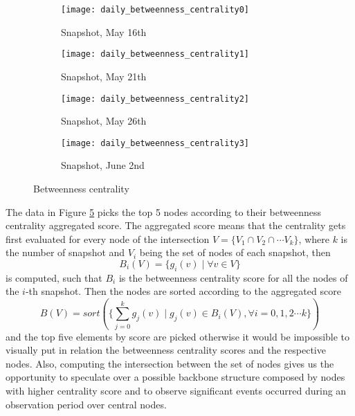 	\begin{figure}
		\centering
		\begin{subfigure}{0.45\textwidth}
			\centering
			\texttt{[image: daily\_betweenness\_centrality0]}
			\caption{Snapshot, May 16th}
			\label{daily_beetwenness0}
		\end{subfigure}
		\begin{subfigure}{0.45\textwidth}
			\centering
			\texttt{[image: daily\_betweenness\_centrality1]}
			\caption{Snapshot, May 21th}
			\label{daily_betweenness1}
		\end{subfigure}
		\begin{subfigure}{0.45\textwidth}
			\centering
			\texttt{[image: daily\_betweenness\_centrality2]}
			\caption{Snapshot, May 26th}
			\label{daily_betweenness2}
		\end{subfigure}
		\begin{subfigure}{0.45\textwidth}
			\centering
			\texttt{[image: daily\_betweenness\_centrality3]}
			\caption{Snapshot, June 2nd}
			\label{daily_betweenness3}
		\end{subfigure}
		
		\caption{Betweenness centrality}
		\label{daily_betweenness}
	\end{figure}	
	
	The data in Figure \ref{daily_betweenness} picks the top 5 nodes according to their betweenness centrality aggregated score. The aggregated score means that the centrality gets first evaluated for every node of the intersection $V = \{V_1 \cap V_2 \cap \cdots V_k \}$, where $k$ is the number of snapshot and $V_i$ being the set of nodes of each snapshot, then
	\begin{equation}\label{eq:betwenness}
		B_i(V) = \{ g_i(v) \mid \forall v \in V \}
	\end{equation}
	is computed, such that $B_i$ is the betweenness centrality score for all the nodes of the $i$-th snapshot. Then the nodes are sorted according to the aggregated score
	\begin{equation}
		B(V) = sort(\{ \sum_{j = 0}^{k}g_j(v) \mid g_j(v) \in B_i(V), \forall i= 0,1,2 \cdots k\})
	\end{equation}
	and the top five elements by score are picked otherwise it would be impossible to visually put in relation the betweenness centrality scores and the respective nodes. Also, computing the intersection between the set of nodes gives us the opportunity to speculate over a possible backbone structure composed by nodes with higher centrality score and to observe significant events occurred during an observation period over central nodes.
	
